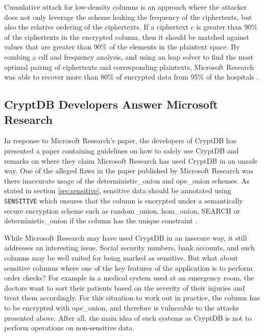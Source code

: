 Cumulative attack for low-density columns is an approach where the attacker does not only leverage the scheme leaking the frequency of the ciphertexts, but also the relative ordering of the ciphertexts. If a ciphertext $c$ is greater than 90\% of the ciphertexts in the encrypted column, then it should be matched against values that are greater than 90\% of the elements in the plaintext space. By combing a \gls{cdf} and frequency analysis, and using an \gls{lsap} solver to find the most optimal pairing of ciphertexts and corresponding plaintexts, Microsoft Research was able to recover more than 80\% of encrypted data from 95\% of the hospitals \cite{microsoft_cryptdb}.

\subsection{CryptDB Developers Answer Microsoft Research}

In response to Microsoft Research's paper, the developers of CryptDB has presented a paper containing guidelines \cite{cryptdb_guidelines} on how to safely use CryptDB and remarks on where they claim Microsoft Research has used CryptDB in an unsafe way. One of the alleged flaws in the paper published by Microsoft Research was there inaccurate usage of the \gls{deterministic_onion} and \gls{ope_onion} schemes. As stated in section \ref{sec:sensitive}, sensitive data should be annotated using \verb!SENSITIVE! which ensures that the column is encrypted under a semantically secure encryption scheme such as \gls{random_onion}, \gls{hom_onion}, SEARCH or \gls{deterministic_onion} if the column has the unique constraint \cite{popa_thesis}. 

While Microsoft Research may have used CryptDB in an insecure way, it still addresses an interesting issue. Social security numbers, bank accounts, and such columns may be well suited for being marked as sensitive. But what about sensitive columns where one of the key features of the application is to perform order checks? For example in a medical system used at an emergency room, the doctors want to sort their patients based on the severity of their injuries and treat them accordingly. For this situation to work out in practice, the column has to be encrypted with \gls{ope_onion}, and therefore is vulnerable to the attacks presented above. After all, the main idea of such systems as CryptDB is not to perform operations on non-sensitive data.